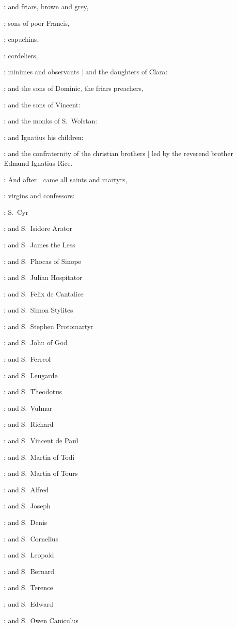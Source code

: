 :
and friars,
brown and grey,

:
sons of poor Francis,

:
capuchins,

:
cordeliers,

:
minimes and observants |
and the daughters of Clara:

:
and the sons of Dominic,
the friars preachers,

:
and the sons of Vincent:

:
and the monks of S.~Wolstan:

:
and Ignatius his children:

:
and the confraternity of the christian brothers |
led by the reverend brother Edmund Ignatius Rice.

:
And after |
came all saints and martyrs,

:
virgins and confessors:

:
S.~Cyr

:
and S.~Isidore Arator

:
and S.~James the Less

:
and S.~Phocas of Sinope

:
and S.~Julian Hospitator

:
and S.~Felix de Cantalice

:
and S.~Simon Stylites

:
and S.~Stephen Protomartyr

:
and S.~John of God

:
and S.~Ferreol

:
and S.~Leugarde

:
and S.~Theodotus

:
and S.~Vulmar

:
and S.~Richard

:
and S.~Vincent de Paul

:
and S.~Martin of Todi

:
and S.~Martin of Tours

:
and S.~Alfred

:
and S.~Joseph

:
and S.~Denis

:
and S.~Cornelius

:
and S.~Leopold

:
and S.~Bernard

:
and S.~Terence

:
and S.~Edward

:
and S.~Owen Caniculus

